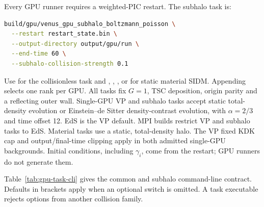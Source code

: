 Every GPU runner requires a weighted-PIC restart.  The subhalo task is:
\par\noindent\begin{minipage}{\linewidth}
\begin{lstlisting}[language=bash]
build/gpu/venus_gpu_subhalo_boltzmann_poisson \
  --restart restart_state.bin \
  --output-directory output/gpu/run \
  --end-time 60 \
  --subhalo-collision-strength 0.1
\end{lstlisting}
\end{minipage}
Use  for the collisionless task and
, ,
, or  for
static material SIDM.  Appending  selects one rank per GPU.
All tasks fix \(G=1\), TSC deposition, origin parity and a reflecting
outer wall. Single-GPU VP and subhalo tasks accept static total-density evolution or
Einstein--de Sitter density-contrast evolution, with \(\alpha=2/3\) and time
offset 12. EdS is the VP default. MPI builds restrict VP and subhalo tasks to EdS.
Material tasks use a static, total-density halo. The VP fixed KDK cap and
output/final-time clipping apply in both admitted single-GPU backgrounds.  Initial conditions,
including \(\gamma_i\), come from the restart; GPU runners do not generate
them.

Table~\ref{tab:gpu-task-cli} gives the common and subhalo
command-line contract.  Defaults in brackets apply when an optional switch is
omitted.  A task executable rejects options from another collision family.

